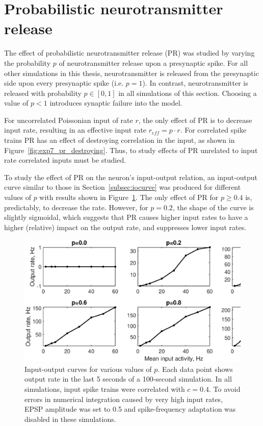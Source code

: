 \documentclass[a4paper,12pt]{report}
\theoremstyle{definition}
\begin{document}
\section{Probabilistic neurotransmitter release} %
\label{sec:probrelease}

The effect of probabilistic neurotransmitter release (PR) was studied by varying the probability $p$ of neurotransmitter release upon a presynaptic spike. For all other simulations in this thesis, neurotransmitter is released from the presynaptic side upon every presynaptic spike (i.e. $p=1$). In contrast, neurotransmitter is released with probability $p \in [0,1]$ in all simulations of this section. Choosing a value of $p<1$ introduces synaptic failure into the model.

For uncorrelated Poissonian input of rate $r$, the only effect of PR is to decrease input rate, resulting in an effective input rate $r_{eff} = p \cdot r$. For correlated spike trains PR has an effect of destroying correlation in the input, as shown in Figure~\ref{fig:exp7_pr_destroying}. Thus, to study effects of PR unrelated to input rate correlated inputs must be studied.



To study the effect of PR on the neuron's input-output relation, an input-output curve similar to those in Section~\ref{subsec:iocurve} was produced for different values of $p$ with results shown in Figure~\ref{fig:exp8gridoutputs}. The only effect of PR for $p \geq 0.4$ is, predictably, to decrease the rate. However, for $p=0.2$, the shape of the curve is slightly sigmoidal, which suggests that PR causes higher input rates to have a higher (relative) impact on the output rate, and suppresses lower input rates.

\begin{figure}[!htb]
    \includegraphics[width=\textwidth]{figures/exp8_gridoutputs_epsp05.eps}
    \caption{Input-output curves for various values of $p$. Each data point shows output rate in the last 5 seconds of a 100-second simulation. In all simulations, input spike trains were correlated with $c=0.4$. To avoid errors in numerical integration caused by very high input rates, EPSP amplitude was set to 0.5 and spike-frequency adaptation was disabled in these simulations.}
    \label{fig:exp8gridoutputs}
\end{figure}
\end{document}
